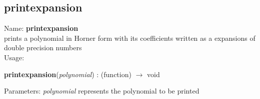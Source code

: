 \subsection{ printexpansion }
\noindent Name: \textbf{printexpansion}\\
prints a polynomial in Horner form with its coefficients written as a expansions of double precision numbers\\

\noindent Usage: 
\begin{center}
\textbf{printexpansion}(\emph{polynomial}) : (\textsf{function}) $\rightarrow$ \textsf{void}\\
\end{center}
Parameters: 
\emph{polynomial} represents the polynomial to be printed\\

